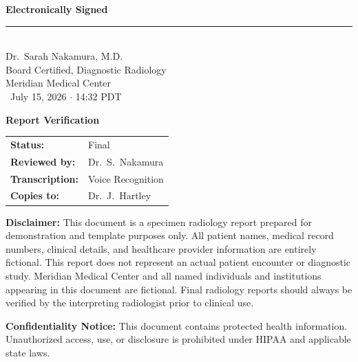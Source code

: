 \documentclass[11pt]{article}
\begin{document}
\vspace{14pt}

\begin{signaturebox}
  \begin{minipage}[t]{0.55\textwidth}
    \vspace{4pt}
    {\sffamily\bfseries\color{primaryblue} Electronically Signed} \\[6pt]
    \rule{3.2in}{0.4pt} \\
    {\small Dr.\ Sarah Nakamura, M.D.} \\
    {\small Board Certified, Diagnostic Radiology} \\
    {\small Meridian Medical Center} \\[4pt]
    {\footnotesize\color{primaryblue!70} \faCalendar\ July 15, 2026 \hspace{4pt}$\cdot$\hspace{4pt} 14:32 PDT}
  \end{minipage}
  \hfill
  \begin{minipage}[t]{0.4\textwidth}
    \vspace{4pt}
    {\sffamily\bfseries\color{primaryblue} Report Verification} \\[6pt]
    \begin{tabular}{@{}p{1.1in} p{1.5in}@{}}
      \textbf{Status:}       & Final \\
      \textbf{Reviewed by:}  & Dr.\ S.\ Nakamura \\
      \textbf{Transcription:}& Voice Recognition \\
      \textbf{Copies to:}    & Dr.\ J.\ Hartley \\
    \end{tabular}
  \end{minipage}
  \par
\end{signaturebox}

\vspace{10pt}

\begin{tcolorbox}[
  colback=primaryblue!4,
  colframe=primaryblue!20,
  boxrule=0.4pt,
  arc=3pt,
  left=10pt,
  right=10pt,
  top=8pt,
  bottom=8pt,
  fontupper=\footnotesize\color{primaryblue!70}
]
  \textbf{Disclaimer:} This document is a specimen radiology report prepared for demonstration and template purposes only. All patient names, medical record numbers, clinical details, and healthcare provider information are entirely fictional. This report does not represent an actual patient encounter or diagnostic study. Meridian Medical Center and all named individuals and institutions appearing in this document are fictional. Final radiology reports should always be verified by the interpreting radiologist prior to clinical use.

  \textbf{Confidentiality Notice:} This document contains protected health information. Unauthorized access, use, or disclosure is prohibited under HIPAA and applicable state laws.
\end{tcolorbox}
\end{document}
